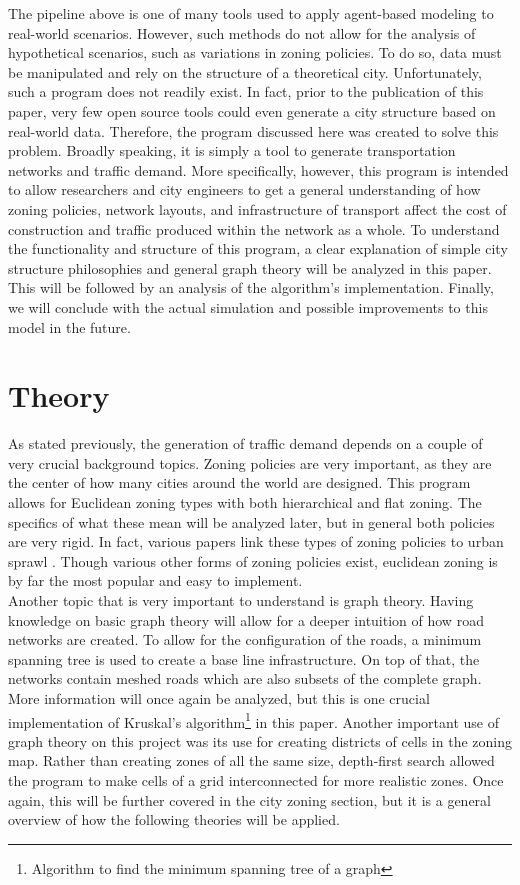 \documentclass[11pt]{article}
\begin{document}
\begin{multicols}{2}
    \quad The pipeline above is one of many tools used to apply agent-based modeling to real-world scenarios. However, such methods do not allow for the analysis of hypothetical scenarios, such as variations in zoning policies. To do so, data must be manipulated and rely on the structure of a theoretical city. Unfortunately, such a program does not readily exist. In fact, prior to the publication of this paper, very few open source tools could even generate a city structure based on real-world data. Therefore, the program discussed here was created to solve this problem. Broadly speaking, it is simply a tool to generate transportation networks and traffic demand. More specifically, however, this program is intended to allow researchers and city engineers to get a general understanding of how zoning policies, network layouts, and infrastructure of transport affect the cost of construction and traffic produced within the network as a whole. To understand the functionality and structure of this program, a clear explanation of simple city structure philosophies and general graph theory will be analyzed in this paper. This will be followed by an analysis of the algorithm's implementation. Finally, we will conclude with the actual simulation and possible improvements to this model in the future.

    \section{Theory}
    \quad As stated previously, the generation of traffic demand depends on a couple of very crucial background topics. Zoning policies are very important, as they are the center of how many cities around the world are designed. This program allows for Euclidean zoning types with both hierarchical and flat zoning. The specifics of what these mean will be analyzed later, but in general both policies are very rigid. In fact, various papers link these types of zoning policies to urban sprawl \cite{zoning}. Though various other forms of zoning policies exist, euclidean zoning is by far the most popular and easy to implement.\\
    
    \quad Another topic that is very important to understand is graph theory. Having knowledge on basic graph theory will allow for a deeper intuition of how road networks are created. To allow for the configuration of the roads, a minimum spanning tree is used to create a base line infrastructure. On top of that, the networks contain meshed roads which are also subsets of the complete graph. More information will once again be analyzed, but this is one crucial implementation of Kruskal's algorithm\footnote{Algorithm to find the minimum spanning tree of a graph} in this paper. Another important use of graph theory on this project was its use for creating districts of cells in the zoning map. Rather than creating zones of all the same size, depth-first search allowed the program to make cells of a grid interconnected for more realistic zones. Once again, this will be further covered in the city zoning section, but it is a general overview of how the following theories will be applied.


\end{multicols}
\end{document}
